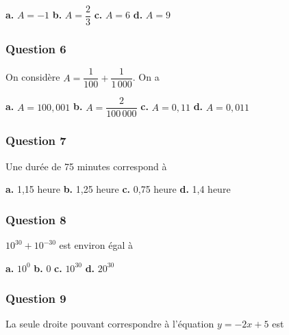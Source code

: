 \textbf{a.} $A = -1$ \hfill \textbf{b.} $A = \dfrac{2}{3}$ \hfill \textbf{c.} $A = 6$ \hfill \textbf{d.} $A = 9$

\subsubsection*{Question 6}
On considère $A = \dfrac{1}{100} + \dfrac{1}{1\,000}$. On a

\textbf{a.} $A = 100,001$ \hfill \textbf{b.} $A = \dfrac{2}{100\,000}$ \hfill \textbf{c.} $A = 0,11$ \hfill \textbf{d.} $A = 0,011$

\subsubsection*{Question 7}
Une durée de 75 minutes correspond à

\textbf{a.} 1,15 heure \hfill \textbf{b.} 1,25 heure \hfill \textbf{c.} 0,75 heure \hfill \textbf{d.} 1,4 heure

\subsubsection*{Question 8}
$10^{30} + 10^{-30}$ est environ égal à

\textbf{a.} $10^0$ \hfill \textbf{b.} 0 \hfill \textbf{c.} $10^{30}$ \hfill \textbf{d.} $20^{30}$

\subsubsection*{Question 9}
La seule droite pouvant correspondre à l'équation $y = -2x + 5$ est


